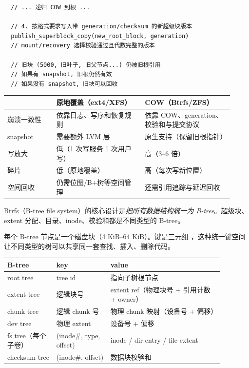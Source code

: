 \begin{filesystemlayout}
\begin{lstlisting}
  // ... 递归 COW 到根 ...

  // 4. 按格式要求写入带 generation/checksum 的新超级块版本
  publish_superblock_copy(new_root_block, generation)
  // mount/recovery 选择校验通过且代数完整的版本

  // 旧块 (5000, 旧叶子, 旧父节点...) 仍被旧根引用
  // 如果有 snapshot, 旧根仍然有效
  // 如果没有 snapshot, 旧块可以回收
\end{lstlisting}

\begin{longtable}{|F{0.2\linewidth}|F{0.36\linewidth}|F{0.36\linewidth}|}
\toprule
{}
& 原地覆盖（ext4/XFS） & COW（Btrfs/ZFS） \\
\midrule
崩溃一致性 & 依靠日志、写序和恢复规则 & 依靠 COW、generation、校验和与提交协议 \\\tablerowrule
snapshot & 需要额外 LVM 层 & 原生支持（保留旧根指针） \\\tablerowrule
写放大 & 低（1 次写服务 1 次用户写） & 高（3--6 倍） \\\tablerowrule
碎片 & 低（原地覆盖） & 高（每次写新位置） \\\tablerowrule
空间回收 & 仍需位图/B+树等空间管理 & 还需引用追踪与延迟回收 \\
\bottomrule
\end{longtable}


Btrfs（B-tree file system）的核心设计是\emph{把所有数据结构统一为 B-tree}。超级块、extent 分配、目录、inode、校验和都是不同类型的 B-tree。

每个 B-tree 节点是一个磁盘块（4 KiB--64 KiB）。键是三元组 ，这种统一键空间让不同类型的树可以共享同一套查找、插入、删除代码。

\begin{longtable}{|F{0.20\linewidth}|F{0.22\linewidth}|F{0.46\linewidth}|}
\toprule
{}
B-tree & key & value \\
\midrule
root tree & tree id & 指向子树根节点 \\\tablerowrule
extent tree & 逻辑块号 & extent ref（物理块号 + 引用计数 + owner） \\\tablerowrule
chunk tree & 逻辑 chunk 号 & 物理 chunk 映射（设备号 + 偏移） \\\tablerowrule
dev tree & 物理 extent & 设备号 + 偏移 \\\tablerowrule
fs tree（每个子卷） & (inode\#, type, offset) & inode / dir entry / file extent \\\tablerowrule
checksum tree & (inode\#, offset) & 数据块校验和 \\
\bottomrule
\end{longtable}


\end{filesystemlayout}
